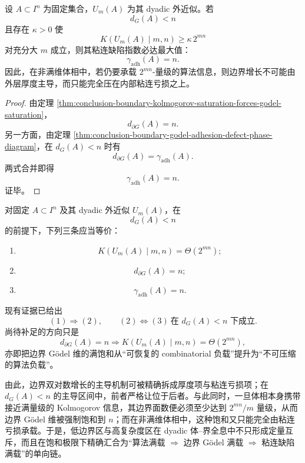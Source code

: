 \begin{corollary}[非满维体相中的算法饱和只能由最大粘连缺陷承载]\label{cor:conclusion-boundary-kolmogorov-saturation-implies-maximal-adhesion}
设 \(A\subset I^n\) 为固定集合，\(U_m(A)\) 为其 dyadic 外近似。若
\[
d_G(A)<n
\]
且存在 \(\kappa>0\) 使
\[
K(U_m(A)\mid m,n)\ge \kappa\,2^{mn}
\]
对充分大 \(m\) 成立，则其粘连缺陷指数必达最大值：
\[
\gamma_{\mathrm{adh}}(A)=n.
\]
因此，在非满维体相中，若仍要承载 \(2^{mn}\)-量级的算法信息，则边界增长不可能由外层厚度主导，而只能完全压在内部粘连亏损之上。
\end{corollary}
\begin{proof}
由定理 \ref{thm:conclusion-boundary-kolmogorov-saturation-forces-godel-saturation}，
\[
d_{\partial G}(A)=n.
\]
另一方面，由定理 \ref{thm:conclusion-boundary-godel-adhesion-defect-phase-diagram}，在 \(d_G(A)<n\) 时有
\[
d_{\partial G}(A)=\gamma_{\mathrm{adh}}(A).
\]
两式合并即得
\[
\gamma_{\mathrm{adh}}(A)=n.
\]
证毕。
\end{proof}

\begin{conjecture}\label{conj:conclusion-boundary-godel-kolmogorov-saturation-equivalence}
对固定 \(A\subset I^n\) 及其 dyadic 外近似 \(U_m(A)\)，在
\[
d_G(A)<n
\]
的前提下，下列三条应当等价：
\begin{enumerate}
  \item
        \[
        K(U_m(A)\mid m,n)=\Theta(2^{mn});
        \]
  \item
        \[
        d_{\partial G}(A)=n;
        \]
  \item
        \[
        \gamma_{\mathrm{adh}}(A)=n.
        \]
\end{enumerate}
现有证据已给出
\[
(1)\Longrightarrow(2),
\qquad
(2)\Longleftrightarrow(3)\ \text{在 }d_G(A)<n\text{ 下成立}.
\]
尚待补足的方向只是
\[
d_{\partial G}(A)=n
\Longrightarrow
K(U_m(A)\mid m,n)=\Theta(2^{mn}),
\]
亦即把边界 Gödel 维的满饱和从“可恢复的 combinatorial 负载”提升为“不可压缩的算法负载”。
\end{conjecture}

\noindent
由此，边界双对数增长的主导机制可被精确拆成厚度项与粘连亏损项；在 \(d_G(A)<n\) 的主导区间中，前者严格让位于后者。与此同时，一旦体相本身携带接近满量级的 Kolmogorov 信息，其边界面数便必须至少达到 \(2^{mn}/m\) 量级，从而边界 Gödel 维被强制饱和到 \(n\)；而在非满维体相中，这种饱和又只能完全由粘连亏损承载。于是，低边界区与高复杂度区在 dyadic 体--界全息中不只形成定量互斥，而且在饱和极限下精确汇合为“算法满载 \(\Rightarrow\) 边界 Gödel 满载 \(\Rightarrow\) 粘连缺陷满载”的单向链。

\endinput

